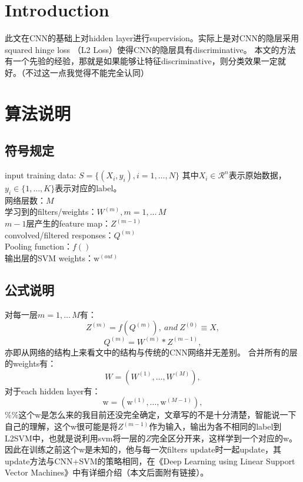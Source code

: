 \documentclass{article}
\begin{document}
\begin{CJK}{UTF8}{gbsn}
\LARGE
\section{Introduction}
此文在CNN的基础上对hidden layer进行supervision。实际上是对CNN的隐层采用squared hinge loss （L2 Loss）使得CNN的隐层具有discriminative。
本文的方法有一个先验的经验，那就是如果能够让特征discriminative，则分类效果一定就好。（不过这一点我觉得不能完全认同）
\section{算法说明}
\subsection{符号规定}
input training data: 
$S=\{(X_i,y_i),i=1,\dots,N\}$ 其中$X_i\in\mathcal{R}^n$表示原始数据，$y_i\in\{1,\dots,K\}$表示对应的label。\\
网络层数：$M$ \\
学习到的filters/weights：$W^{(m)},m=1,\dots\,M$ \\
$m-1$层产生的feature map：$Z^{(m-1)}$ \\
convolved/filtered responses：$Q^{(m)}$ \\
Pooling function：$f()$ \\
输出层的SVM weights：$\mathrm{w}^{(out)}$
\subsection{公式说明}
对每一层$m=1,\dots\,M$有：
\begin{equation} Z^{(m)}=f(Q^{(m)}),~and~Z^{(0)}\equiv X, \end{equation}
\begin{equation} Q^{(m)}=W^{(m)}\ast Z^{(m-1)}, \end{equation}
亦即从网络的结构上来看文中的结构与传统的CNN网络并无差别。
合并所有的层的weights有：
$$W=(W^{(1)},\dots,W^{(M)}),$$
对于each hidden layer有：
$$\mathrm{w}=(\mathrm{w}^{(1)},\dots,\mathrm{w}^{(M-1)}),$$
{\color{red}\%\%}这个w是怎么来的我目前还没完全确定，文章写的不是十分清楚，智能说一下自己的理解，这个w很可能是将$Z^{(m-1)}$作为输入，输出为各不相同的label到L2SVM中，也就是说利用svm将一层的$Z$完全区分开来，这样学到一个对应的w。因此在训练之前这个w是未知的，他与每一次filters update时一起update，其update方法与CNN+SVM的策略相同，在《Deep Learning using Linear Support Vector Machines》中有详细介绍（本文后面附有链接）。


\end{CJK}
\end{document}
